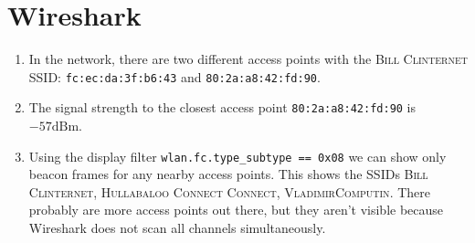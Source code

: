 \documentclass[11pt]{article}
\begin{document}
\section{Wireshark}
\begin{enumerate}[label=(\alph*)]
\item {
	In the network, there are two different access points with the \textsc{Bill Clinternet} SSID: \texttt{fc:ec:da:3f:b6:43} and \texttt{80:2a:a8:42:fd:90}.
	
	
}
\item {
	The signal strength to the closest access point \texttt{80:2a:a8:42:fd:90} is $-57 \text{dBm}$.
	
}
\item {
	Using the display filter \texttt{wlan.fc.type\_subtype == 0x08} we can show only beacon frames for any nearby access points. This shows the SSIDs \textsc{Bill Clinternet, Hullabaloo Connect Connect, VladimirComputin}. There probably are more access points out there, but they aren't visible because Wireshark does not scan all channels simultaneously.
	
	
	
}
\end{enumerate}	
\end{document}
